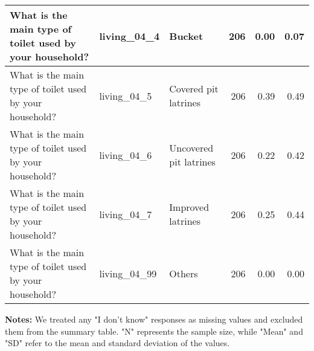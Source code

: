 \begin{landscape}
\begin{longtable}{|p{10cm}|l|p{3cm}|r|r|r|}
\hline
What is the main type of toilet used by your household? & living\_04\_4 & Bucket & 206 & 0.00 & 0.07 \\ 
\hline
What is the main type of toilet used by your household? & living\_04\_5 & Covered pit latrines & 206 & 0.39 & 0.49 \\ 
\hline
What is the main type of toilet used by your household? & living\_04\_6 & Uncovered pit latrines & 206 & 0.22 & 0.42 \\ 
\hline
What is the main type of toilet used by your household? & living\_04\_7 & Improved latrines & 206 & 0.25 & 0.44 \\ 
\hline
What is the main type of toilet used by your household? & living\_04\_99 & Others & 206 & 0.00 & 0.00 \\ 
\bottomrule
\end{longtable}
\noindent \hspace{2.5cm} \parbox{0.9\textwidth}{\textbf{Notes:} We treated any "I don't know" responses as missing values and excluded them from the summary table. "N" represents the sample size, while "Mean" and "SD" refer to the mean and standard deviation of the values.}



\end{landscape}
\restoregeometry